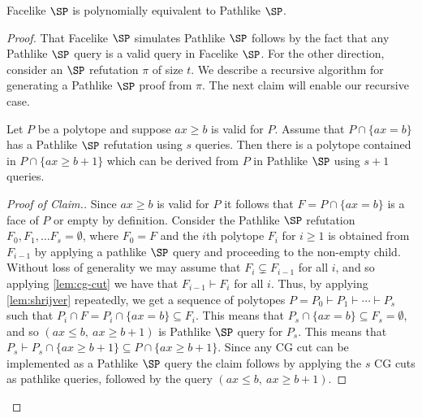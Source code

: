 \documentclass{toc}
\begin{document}
	\begin{theorem}
	\label{lem:SPtopSP}
		Facelike $\SP$ is polynomially equivalent to Pathlike $\SP$.	
	\end{theorem}
	\begin{proof}
		That Facelike $\SP$ simulates Pathlike $\SP$ follows by the fact that any Pathlike $\SP$ query is a valid query in Facelike $\SP$.  
		For the other direction, consider an $\SP$ refutation $\pi$ of size $t$. 
		We describe a recursive algorithm for generating a Pathlike $\SP$ proof from $\pi$.
		The next claim will enable our recursive case.
	
	\begin{claim}Let $P$ be a polytope and suppose $ax \geq b$ is valid for $P$. 
	Assume that $P \cap \{ax = b\}$ has a Pathlike $\SP$ refutation using $s$ queries. 
	Then there is a polytope contained in $P \cap \{ax \geq b+1\}$ which can be derived from $P$ in Pathlike $\SP$ using $s+1$ queries. \end{claim}
	\begin{proof}[Proof of Claim.]
		Since $ax \geq b$ is valid for $P$ it follows that $F = P \cap \{ax = b\}$ is a face of $P$ or empty by definition.
		Consider the Pathlike $\SP$ refutation  $F_0, F_1, \ldots F_s = \emptyset$, where $F_0=F$ and the $i$th polytope $F_i$ for $i \geq 1$ is obtained from $F_{i-1}$ by applying a pathlike $\SP$ query and proceeding to the non-empty child.
		Without loss of generality we may assume that $F_i \subsetneq F_{i-1}$ for all $i$, and so applying \autoref{lem:cg-cut} we have that $F_{i-1} \vdash F_i$ for all $i$.
		Thus, by applying \autoref{lem:shrijver} repeatedly, we get a sequence of polytopes $P = P_0 \vdash P_1 \vdash \cdots \vdash P_s$ such that $P_i \cap F = P_i \cap \{ax = b\} \subseteq F_i$. 
		This means that $P_s \cap \{ax = b\} \subseteq F_s = \emptyset$, and so $(ax \leq b,~ ax \geq b+1)$ is Pathlike $\SP$ query for $P_s$. 
		This means that $P_s \vdash P_s \cap \{ax \geq b+1\} \subseteq P \cap \{ax \geq b+1\}$.
		Since any CG cut can be implemented as a Pathlike $\SP$ query the claim follows by applying the $s$ CG cuts as pathlike queries, followed by the query $(ax \leq b,~ ax \geq b+1)$.
	\end{proof}
	

\end{proof}
\end{document}

